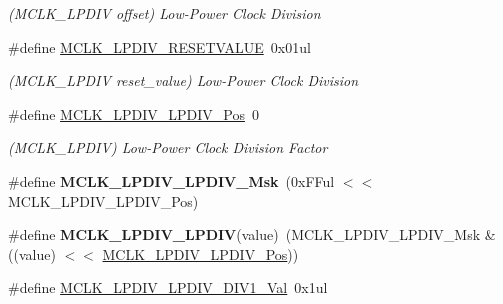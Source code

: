\begin{DoxyCompactItemize}
\begin{DoxyCompactList}\small\item\em (M\+C\+L\+K\+\_\+\+L\+P\+D\+I\+V offset) Low-\/\+Power Clock Division \end{DoxyCompactList}\item 
\hypertarget{group___s_a_m_l21___m_c_l_k_ga1e1b0d70e59a1295aee353dbbb59d4e7}{}\#define \hyperlink{group___s_a_m_l21___m_c_l_k_ga1e1b0d70e59a1295aee353dbbb59d4e7}{M\+C\+L\+K\+\_\+\+L\+P\+D\+I\+V\+\_\+\+R\+E\+S\+E\+T\+V\+A\+L\+U\+E}~0x01ul\label{group___s_a_m_l21___m_c_l_k_ga1e1b0d70e59a1295aee353dbbb59d4e7}

\begin{DoxyCompactList}\small\item\em (M\+C\+L\+K\+\_\+\+L\+P\+D\+I\+V reset\+\_\+value) Low-\/\+Power Clock Division \end{DoxyCompactList}\item 
\hypertarget{group___s_a_m_l21___m_c_l_k_gad9275e73d38bc33c74fe1d10e17e0023}{}\#define \hyperlink{group___s_a_m_l21___m_c_l_k_gad9275e73d38bc33c74fe1d10e17e0023}{M\+C\+L\+K\+\_\+\+L\+P\+D\+I\+V\+\_\+\+L\+P\+D\+I\+V\+\_\+\+Pos}~0\label{group___s_a_m_l21___m_c_l_k_gad9275e73d38bc33c74fe1d10e17e0023}

\begin{DoxyCompactList}\small\item\em (M\+C\+L\+K\+\_\+\+L\+P\+D\+I\+V) Low-\/\+Power Clock Division Factor \end{DoxyCompactList}\item 
\hypertarget{group___s_a_m_l21___m_c_l_k_gae69bcc4ce96b750eb890f742276ba127}{}\#define {\bfseries M\+C\+L\+K\+\_\+\+L\+P\+D\+I\+V\+\_\+\+L\+P\+D\+I\+V\+\_\+\+Msk}~(0x\+F\+Ful $<$$<$ M\+C\+L\+K\+\_\+\+L\+P\+D\+I\+V\+\_\+\+L\+P\+D\+I\+V\+\_\+\+Pos)\label{group___s_a_m_l21___m_c_l_k_gae69bcc4ce96b750eb890f742276ba127}

\item 
\hypertarget{group___s_a_m_l21___m_c_l_k_ga162afa860299e19823eff8ca539a2fe9}{}\#define {\bfseries M\+C\+L\+K\+\_\+\+L\+P\+D\+I\+V\+\_\+\+L\+P\+D\+I\+V}(value)~(M\+C\+L\+K\+\_\+\+L\+P\+D\+I\+V\+\_\+\+L\+P\+D\+I\+V\+\_\+\+Msk \& ((value) $<$$<$ \hyperlink{group___s_a_m_l21___m_c_l_k_gad9275e73d38bc33c74fe1d10e17e0023}{M\+C\+L\+K\+\_\+\+L\+P\+D\+I\+V\+\_\+\+L\+P\+D\+I\+V\+\_\+\+Pos}))\label{group___s_a_m_l21___m_c_l_k_ga162afa860299e19823eff8ca539a2fe9}

\item 
\hypertarget{group___s_a_m_l21___m_c_l_k_gab7ad1f7299520f4cc271641d3c1d45af}{}\#define \hyperlink{group___s_a_m_l21___m_c_l_k_gab7ad1f7299520f4cc271641d3c1d45af}{M\+C\+L\+K\+\_\+\+L\+P\+D\+I\+V\+\_\+\+L\+P\+D\+I\+V\+\_\+\+D\+I\+V1\+\_\+\+Val}~0x1ul\label{group___s_a_m_l21___m_c_l_k_gab7ad1f7299520f4cc271641d3c1d45af}


\end{DoxyCompactItemize}
